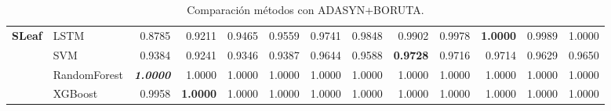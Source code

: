 \begin{table}[H]
\begin{adjustbox}{max width=12cm}
\begin{tabular}{|c|l|r|r|r|r|r|r|r|r|r|r|r|}
			\hline
			\textbf{SLeaf}        & LSTM         & 0.8785                   & 0.9211 & 0.9465          & 0.9559 & 0.9741          & 0.9848 & 0.9902          & 0.9978                   & \textbf{1.0000} & 0.9989          & 1.0000 \\
			                      & SVM          & 0.9384                   & 0.9241 & 0.9346          & 0.9387 & 0.9644          & 0.9588 & \textbf{0.9728}          & 0.9716                   & 0.9714                   & 0.9629          & 0.9650 \\
			                      & RandomForest & \textit{\textbf{1.0000}}          & 1.0000 & 1.0000          & 1.0000 & 1.0000          & 1.0000 & 1.0000          & 1.0000                   & 1.0000                   & 1.0000          & 1.0000 \\
			                      & XGBoost      & 0.9958                   & \textbf{1.0000} & 1.0000          & 1.0000 & 1.0000          & 1.0000 & 1.0000          & 1.0000                   & 1.0000                   & 1.0000          & 1.0000 \\
			\hline
		\end{tabular}
	\end{adjustbox}
	\caption{Comparación métodos con ADASYN+BORUTA.}
	\label{tab:all_comp_adasyn_boruta}
\end{table}



